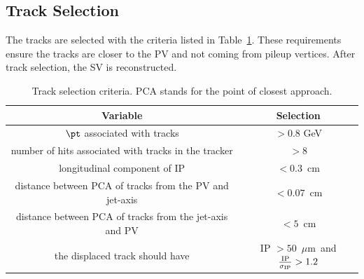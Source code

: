 \subsection{Track Selection}
\label{ss:Track Selection}
The tracks are selected with the criteria listed in Table~\ref{tab:track_sel}.
These requirements ensure the tracks are closer to the PV and not coming from pileup vertices.
After track selection, the SV is reconstructed.
\begin{table}
  \caption{Track selection criteria. PCA stands for the point of closest approach.}
 \begin{center}
 \begin{tabular}{cc}\hline\hline
 Variable & Selection \\ \hline\hline
 $\pt$ associated with tracks & $>0.8$ GeV \\
 number of hits associated with tracks in the tracker & $>8$ \\
 longitudinal component of IP & $< 0.3$~\unit{cm}\\
 distance between PCA of tracks from the PV and jet-axis & $<0.07$~\unit{cm}\\
 distance between PCA of tracks from the jet-axis and PV & $< 5$~\unit{cm}\\
 the displaced track should have & IP $>50$~\unit{$\mu$m} and $\frac{\rm IP}{\sigma_{\rm IP}}>1.2$\\\hline
 \end{tabular}
 \end{center}
 \label{tab:track_sel}
 \end{table}

